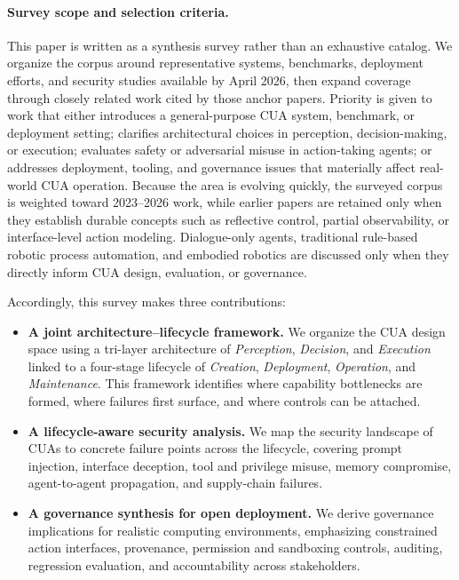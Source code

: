 \paragraph{Survey scope and selection criteria.}
This paper is written as a synthesis survey rather than an exhaustive catalog. We organize the corpus around representative systems, benchmarks, deployment efforts, and security studies available by April 2026, then expand coverage through closely related work cited by those anchor papers. Priority is given to work that either introduces a general-purpose CUA system, benchmark, or deployment setting; clarifies architectural choices in perception, decision-making, or execution; evaluates safety or adversarial misuse in action-taking agents; or addresses deployment, tooling, and governance issues that materially affect real-world CUA operation. Because the area is evolving quickly, the surveyed corpus is weighted toward 2023--2026 work, while earlier papers are retained only when they establish durable concepts such as reflective control, partial observability, or interface-level action modeling. Dialogue-only agents, traditional rule-based robotic process automation, and embodied robotics are discussed only when they directly inform CUA design, evaluation, or governance.

Accordingly, this survey makes three contributions:
\begin{itemize}
  \item \textbf{A joint architecture--lifecycle framework.} We organize the CUA design space using a tri-layer architecture of \emph{Perception}, \emph{Decision}, and \emph{Execution} linked to a four-stage lifecycle of \emph{Creation}, \emph{Deployment}, \emph{Operation}, and \emph{Maintenance}. This framework identifies where capability bottlenecks are formed, where failures first surface, and where controls can be attached.
  \item \textbf{A lifecycle-aware security analysis.} We map the security landscape of CUAs to concrete failure points across the lifecycle, covering prompt injection, interface deception, tool and privilege misuse, memory compromise, agent-to-agent propagation, and supply-chain failures.
  \item \textbf{A governance synthesis for open deployment.} We derive governance implications for realistic computing environments, emphasizing constrained action interfaces, provenance, permission and sandboxing controls, auditing, regression evaluation, and accountability across stakeholders.
\end{itemize}

